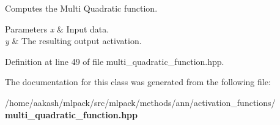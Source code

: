 Computes the Multi Quadratic function. 


\begin{DoxyParams}{Parameters}
{\em x} & Input data. \\
\hline
{\em y} & The resulting output activation. \\
\hline
\end{DoxyParams}


Definition at line 49 of file multi\+\_\+quadratic\+\_\+function.\+hpp.



The documentation for this class was generated from the following file\+:\begin{DoxyCompactItemize}
\item 
/home/aakash/mlpack/src/mlpack/methods/ann/activation\+\_\+functions/\textbf{ multi\+\_\+quadratic\+\_\+function.\+hpp}\end{DoxyCompactItemize}
